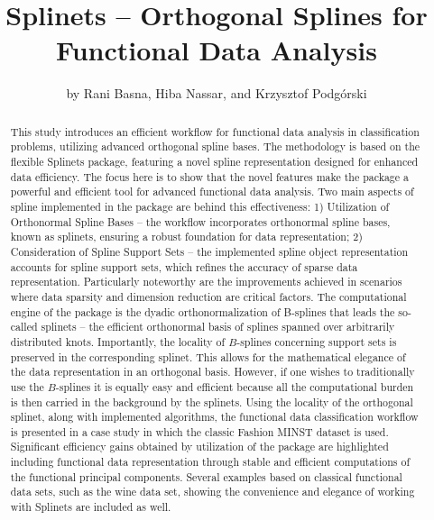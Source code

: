 \title{Splinets -- Orthogonal Splines for Functional Data Analysis}
\author{by Rani Basna, Hiba Nassar, and Krzysztof Podg\'{o}rski}

\maketitle

\begin{abstract}
This study introduces an efficient workflow for functional data analysis in
classification problems, utilizing advanced orthogonal spline bases.  The
methodology is based on the flexible Splinets package, featuring a
novel spline representation designed for enhanced data efficiency. The focus
here is to show that the novel features make the package a powerful and
efficient tool for advanced functional data analysis.  Two main aspects of
spline implemented in the package are behind this effectiveness: 1)
Utilization of Orthonormal Spline Bases -- the workflow incorporates
orthonormal spline bases, known as splinets, ensuring a robust foundation for
data representation; 2) Consideration of Spline Support Sets -- the
implemented spline object representation accounts for spline support sets,
which refines the accuracy of sparse data representation.  Particularly
noteworthy are the improvements achieved in scenarios where data sparsity and
dimension reduction are critical factors.  The computational engine of the
package is the dyadic orthonormalization of B-splines that leads the
so-called splinets -- the efficient orthonormal basis of splines spanned
over arbitrarily distributed knots.  Importantly, the locality of $B$-splines
concerning support sets is preserved in the corresponding splinet.
This allows for the mathematical elegance of the data representation in an
orthogonal basis. However, if one wishes to traditionally use the $B$-splines
it is equally easy and efficient because all the computational burden is then
carried in the background by the splinets. 
Using the locality of the orthogonal splinet, along with implemented
algorithms, the functional data classification workflow is presented in a case
study in which the classic Fashion MINST dataset is used.  Significant
efficiency gains obtained by utilization of the package are highlighted
including functional data representation through stable and efficient
computations of the functional principal components. Several examples based on
classical functional data sets, such as the wine data set,  showing the
convenience and elegance of working with Splinets are included as
well. 
\end{abstract}



